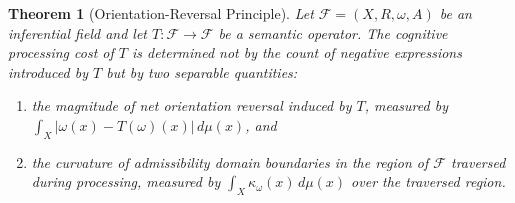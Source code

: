 \documentclass[12pt]{article}
\newtheorem{theorem}{Theorem}[section]
\theoremstyle{remark}
\begin{document}
\begin{theorem}[Orientation-Reversal Principle]
\label{thm:orp}
Let $\mathcal{F} = (X, R, \omega, A)$ be an inferential field and let
$T : \mathcal{F} \to \mathcal{F}$ be a semantic operator. The cognitive
processing cost of $T$ is determined not by the count of negative
expressions introduced by $T$ but by two separable quantities:
\begin{enumerate}
\item[(i)] the magnitude of net orientation reversal induced by $T$,
measured by $\int_X |\omega(x) - T(\omega)(x)|\, d\mu(x)$, and
\item[(ii)] the curvature of admissibility domain boundaries in the
region of $\mathcal{F}$ traversed during processing, measured by
$\int_X \kappa_\omega(x)\, d\mu(x)$ over the traversed region.
\end{enumerate}
\end{theorem}
\end{document}
